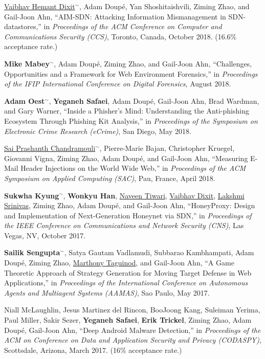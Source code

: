 \documentclass[11pt,letterpaper,sans]{moderncv}
\begin{document}
\begin{etaremune}
\item \underline{Vaibhav Hemant Dixit}$^{\sim}$, Adam Doup\'e, Yan
  Shoshitaishvili, Ziming Zhao, and Gail-Joon Ahn, ``AIM-SDN:
  Attacking Information Mismanagement in SDN-datastores,'' in
  \emph{Proceedings of the ACM Conference on Computer and
    Communications Security (CCS)}, Toronto, Canada, October 2018. (16.6\% acceptance rate.)

\item \textbf{Mike Mabey}$^{\sim}$, Adam Doup\'e, Ziming Zhao, and Gail-Joon Ahn, ``Challenges, Opportunities and a Framework for Web Environment Forensics,'' in \emph{Proceedings of the IFIP International Conference on Digital Forensics}, August 2018.
  
\item \textbf{Adam Oest}$^{\sim}$, \textbf{Yeganeh Safaei}, Adam Doup\'e,
  Gail-Joon Ahn, Brad Wardman, and Gary Warner, ``Inside a Phisher's
  Mind: Understanding the Anti-phishing Ecosystem Through Phishing Kit
  Analysis,'' in \emph{Proceedings of the Symposium on Electronic
    Crime Research (eCrime)}, San Diego, May 2018. 
  
\item \underline{Sai Prashanth Chandramouli}$^{\sim}$, Pierre-Marie Bajan,
  Christopher Kruegel, Giovanni Vigna, Ziming Zhao, Adam Doup\'e, and
  Gail-Joon Ahn, ``Measuring E-Mail Header Injections on the World
  Wide Web,'' in \emph{Proceedings of the ACM Symposium on Applied
    Computing (SAC)}, Pau, France, April 2018.

\item \textbf{Sukwha Kyung}$^{\sim}$, \textbf{Wonkyu Han},
  \underline{Naveen Tiwari}, \underline{Vaibhav Dixit},
  \underline{Lakshmi Srinivas}, Ziming Zhao, Adam Doup\'e, and
  Gail-Joon Ahn, ``HoneyProxy: Design and Implementation of
  Next-Generation Honeynet via SDN,'' in \emph{Proceedings of the IEEE
    Conference on Communications and Network Security (CNS)}, Las
  Vegas, NV, October 2017. 

\item \textbf{Sailik Sengupta}$^{\sim}$, Satya Gautam Vadlamudi, Subbarao Kambhampati,
  Adam Doup\'e, Ziming Zhao, \underline{Marthony Taguinod},
  and Gail-Joon Ahn, ``A Game Theoretic Approach of Strategy
  Generation for Moving Target Defense in Web Applications,'' in
  \emph{Proceedings of the International Conference on Autonomous Agents
    and Multiagent Systems (AAMAS)}, Sao Paulo, May 2017.

\item Niall McLaughlin, Jesus Martinez del Rincon, BooJoong Kang,
  Suleiman Yerima, Paul Miller, Sakir Sezer, \textbf{Yeganeh
    Safaei}, \textbf{Erik Trickel}, Ziming Zhao, Adam
    Doup\'e, Gail-Joon Ahn, ``Deep Android Malware Detection,'' in
  \emph{Proceedings of the ACM on Conference on Data and Application
    Security and Privacy (CODASPY)}, Scottsdale, Arizona, March 2017. (16\% acceptance rate.)


\end{etaremune}
\end{document}
